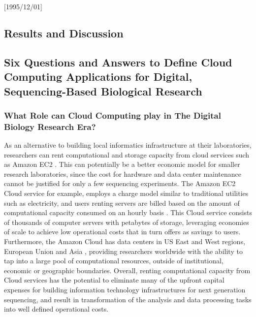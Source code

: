 \NeedsTeXFormat{LaTeX2e}[1995/12/01] \documentclass[10pt]{bmc_article}
\newenvironment{bmcformat}{\begin{raggedright}\baselineskip20pt\sloppy\setboolean{publ}{false}}{\end{raggedright}\baselineskip20pt\sloppy}
\begin{document}
\begin{bmcformat}

\section*{Results and Discussion}
\subsection*{Six Questions and Answers to Define Cloud Computing Applications for Digital, Sequencing-Based Biological Research} 

\subsubsection*{What Role can Cloud Computing play in The Digital Biology Research Era?}

As an alternative to building local informatics infrastructure at their laboratories, researchers can rent 
computational and storage capacity from cloud services such as Amazon EC2 \cite{awsec2}. This can potentially be
a better economic model for smaller research laboratories, since the cost for hardware and data center 
maintenance cannot be justified for only a few sequencing experiments. The Amazon EC2 Cloud service for example, 
employs a charge model similar to traditional utilities such as electricity, and users 
renting servers are billed based on the amount of computational capacity consumed on an hourly basis \cite{ec2price}. 
This Cloud service consists of thousands of computer servers with petabytes of storage, leveraging economies of 
scale to achieve low operational costs that in turn offers as savings to users. Furthermore, the Amazon Cloud 
has data centers in US East and West regions, European Union and Asia \cite{ec2regions}, providing researchers 
worldwide with the ability to tap into a large pool of computational resources, outside of institutional, 
economic or geographic boundaries. Overall, renting computational capacity from Cloud services has the 
potential to eliminate many of the upfront capital expenses for building information technology infrastructures 
for next generation sequencing, and result in transformation of the analysis and data processing tasks into well 
defined operational costs. 


\end{bmcformat}
\end{document}
